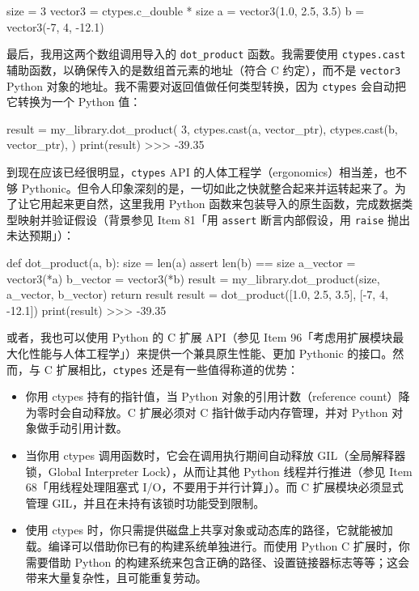 \begin{codebox}[python]
size = 3
vector3 = ctypes.c_double * size
a = vector3(1.0, 2.5, 3.5)
b = vector3(-7, 4, -12.1)
\end{codebox}

最后，我用这两个数组调用导入的 \texttt{dot\_product} 函数。我需要使用 \texttt{ctypes.cast} 辅助函数，以确保传入的是数组首元素的地址（符合 C 约定），而不是 \texttt{vector3} Python 对象的地址。我不需要对返回值做任何类型转换，因为 \texttt{ctypes} 会自动把它转换为一个 Python 值：

\begin{codebox}[python]
result = my_library.dot_product(
    3,
    ctypes.cast(a, vector_ptr),
    ctypes.cast(b, vector_ptr),
)
print(result)
>>>
-39.35
\end{codebox}

到现在应该已经很明显，\texttt{ctypes} API 的人体工程学（ergonomics）相当差，也不够 Pythonic。但令人印象深刻的是，一切如此之快就整合起来并运转起来了。为了让它用起来更自然，这里我用 Python 函数来包装导入的原生函数，完成数据类型映射并验证假设（背景参见 Item 81「用 \texttt{assert} 断言内部假设，用 \texttt{raise} 抛出未达预期」）：

\begin{codebox}[python]
def dot_product(a, b):
    size = len(a)
    assert len(b) == size
    a_vector = vector3(*a)
    b_vector = vector3(*b)
    result = my_library.dot_product(size, a_vector, b_vector)
    return result
result = dot_product([1.0, 2.5, 3.5], [-7, 4, -12.1])
print(result)
>>>
-39.35
\end{codebox}

或者，我也可以使用 Python 的 C 扩展 API（参见 Item 96「考虑用扩展模块最大化性能与人体工程学」）来提供一个兼具原生性能、更加 Pythonic 的接口。然而，与 C 扩展相比，\texttt{ctypes} 还是有一些值得称道的优势：

\begin{itemize}
\item 你用 ctypes 持有的指针值，当 Python 对象的引用计数（reference count）降为零时会自动释放。C 扩展必须对 C 指针做手动内存管理，并对 Python 对象做手动引用计数。
\item 当你用 ctypes 调用函数时，它会在调用执行期间自动释放 GIL（全局解释器锁，Global Interpreter Lock），从而让其他 Python 线程并行推进（参见 Item 68「用线程处理阻塞式 I/O，不要用于并行计算」）。而 C 扩展模块必须显式管理 GIL，并且在未持有该锁时功能受到限制。
\item 使用 ctypes 时，你只需提供磁盘上共享对象或动态库的路径，它就能被加载。编译可以借助你已有的构建系统单独进行。而使用 Python C 扩展时，你需要借助 Python 的构建系统来包含正确的路径、设置链接器标志等等；这会带来大量复杂性，且可能重复劳动。
\end{itemize}

